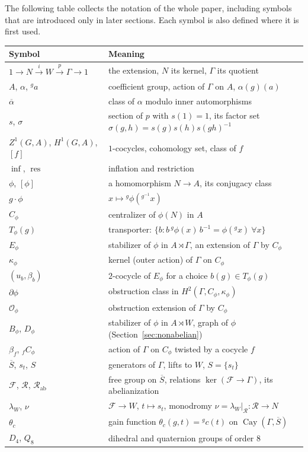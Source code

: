 \documentclass[12pt,letterpaper]{article}
\numberwithin{equation}{section}
\theoremstyle{plain}
\theoremstyle{definition}
\newcommand{\act}[2]{{}^{#1}\!#2}          %
\newcommand{\fr}{\mathcal{F}}             %
\newcommand{\rel}{\mathcal{R}}            %
\DeclareMathOperator{\Cay}{Cay}
\DeclareMathOperator{\infl}{inf}
\DeclareMathOperator{\res}{res}
\begin{document}
The following table collects the notation of the whole paper, including
symbols that are introduced only in later sections. Each symbol is also
defined where it is first used.

\begin{center}
\begin{tabular}{@{}p{}p{}@{}}
\toprule
Symbol & Meaning \\
\midrule
$1\to N\overset{i}{\to}W\overset{p}{\to}\Gamma\to1$ & the extension,
$N$ its kernel, $\Gamma$ its quotient \\
$A$, $\alpha$, $\act{g}{a}$ & coefficient group, action of $\Gamma$ on $A$,
$\alpha(g)(a)$ \\
$\overline{\alpha}$ & class of $\alpha$ modulo inner automorphisms \\
$s$, $\sigma$ & section of $p$ with $s(1)=1$, its factor set
$\sigma(g,h)=s(g)s(h)s(gh)^{-1}$ \\
$Z^1(G,A)$, $H^1(G,A)$, $[f]$ & $1$-cocycles, cohomology set, class of $f$ \\
$\infl$, $\res$ & inflation and restriction \\
$\phi$, $[\phi]$ & a homomorphism $N\to A$, its conjugacy class \\
$g\cdot\phi$ & $x\mapsto\act{g}{\phi(\act{g^{-1}}{x})}$ \\
$C_\phi$ & centralizer of $\phi(N)$ in $A$ \\
$T_\phi(g)$ & transporter:
$\{b: b\,\act{g}{\phi(x)}\,b^{-1}=\phi(\act{g}{x})\ \forall x\}$ \\
$E_\phi$ & stabilizer of $\phi$ in $A\rtimes\Gamma$, an extension of
$\Gamma$ by $C_\phi$ \\
$\kappa_\phi$ & kernel (outer action) of $\Gamma$ on $C_\phi$ \\
$(u_b,\beta_b)$ & $2$-cocycle of $E_\phi$ for a choice $b(g)\in T_\phi(g)$ \\
$\partial\phi$ & obstruction class in $H^2(\Gamma,C_\phi,\kappa_\phi)$ \\
$\mathcal{O}_\phi$ & obstruction extension of $\Gamma$ by $C_\phi$ \\
$B_\phi$, $D_\phi$ & stabilizer of $\phi$ in $A\rtimes W$, graph of $\phi$
(Section~\ref{sec:nonabelian}) \\
$\beta_f$, ${}_fC_\phi$ & action of $\Gamma$ on $C_\phi$ twisted by a
cocycle $f$ \\
$\overline{S}$, $s_t$, $S$ & generators of $\Gamma$, lifts to $W$,
$S=\{s_t\}$ \\
$\fr$, $\rel$, $\rel_{\mathrm{ab}}$ & free group on $\overline{S}$,
relations $\ker(\fr\to\Gamma)$, its abelianization \\
$\lambda_W$, $\nu$ & $\fr\to W$, $t\mapsto s_t$, monodromy
$\nu=\lambda_W|_{\rel}:\rel\to N$ \\
$\theta_c$ & gain function $\theta_c(g,t)=\act{g}{c(t)}$ on
$\Cay(\Gamma,\overline{S})$ \\
$D_4$, $Q_8$ & dihedral and quaternion groups of order $8$ \\
\bottomrule
\end{tabular}
\end{center}
\end{document}
